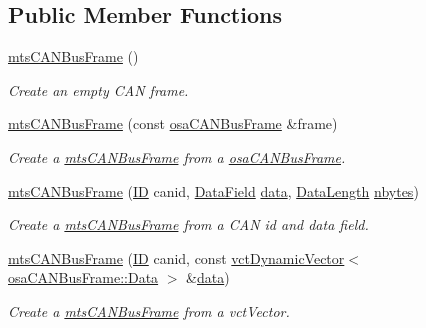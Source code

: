 \subsection*{Public Member Functions}
\begin{DoxyCompactItemize}
\item 
\hyperlink{classmts_c_a_n_bus_frame_ab0b58884accaf6b048241882c90cf31c}{mts\-C\-A\-N\-Bus\-Frame} ()
\begin{DoxyCompactList}\small\item\em Create an empty C\-A\-N frame. \end{DoxyCompactList}\item 
\hyperlink{classmts_c_a_n_bus_frame_a3db84ff04b7d9c5a7f88704e1d4b4871}{mts\-C\-A\-N\-Bus\-Frame} (const \hyperlink{classosa_c_a_n_bus_frame}{osa\-C\-A\-N\-Bus\-Frame} \&frame)
\begin{DoxyCompactList}\small\item\em Create a \hyperlink{classmts_c_a_n_bus_frame}{mts\-C\-A\-N\-Bus\-Frame} from a \hyperlink{classosa_c_a_n_bus_frame}{osa\-C\-A\-N\-Bus\-Frame}. \end{DoxyCompactList}\item 
\hyperlink{classmts_c_a_n_bus_frame_ac3fe2d8ad4bbdcb44fc40c2ba1fecdc7}{mts\-C\-A\-N\-Bus\-Frame} (\hyperlink{classosa_c_a_n_bus_frame_ae917bcfe6427b2055a405716909c6048}{I\-D} canid, \hyperlink{classosa_c_a_n_bus_frame_ac41162892eefb85a1308d485ec630969}{Data\-Field} \hyperlink{classosa_c_a_n_bus_frame_ae5114021468fe3ca35f95ec123db1e2d}{data}, \hyperlink{classosa_c_a_n_bus_frame_ab5bacbd4959a9046925438af889744f4}{Data\-Length} \hyperlink{classosa_c_a_n_bus_frame_abc694b0742e9c5b7e2db8640caa17565}{nbytes})
\begin{DoxyCompactList}\small\item\em Create a \hyperlink{classmts_c_a_n_bus_frame}{mts\-C\-A\-N\-Bus\-Frame} from a C\-A\-N id and data field. \end{DoxyCompactList}\item 
\hyperlink{classmts_c_a_n_bus_frame_acc63f8714da9aa70e92d26862e1be54a}{mts\-C\-A\-N\-Bus\-Frame} (\hyperlink{classosa_c_a_n_bus_frame_ae917bcfe6427b2055a405716909c6048}{I\-D} canid, const \hyperlink{classvct_dynamic_vector}{vct\-Dynamic\-Vector}$<$ \hyperlink{classosa_c_a_n_bus_frame_a938f540c9de33b240d3bc4f21c341ba5}{osa\-C\-A\-N\-Bus\-Frame\-::\-Data} $>$ \&\hyperlink{classosa_c_a_n_bus_frame_ae5114021468fe3ca35f95ec123db1e2d}{data})
\begin{DoxyCompactList}\small\item\em Create a \hyperlink{classmts_c_a_n_bus_frame}{mts\-C\-A\-N\-Bus\-Frame} from a vct\-Vector. \end{DoxyCompactList}\end{DoxyCompactItemize}
